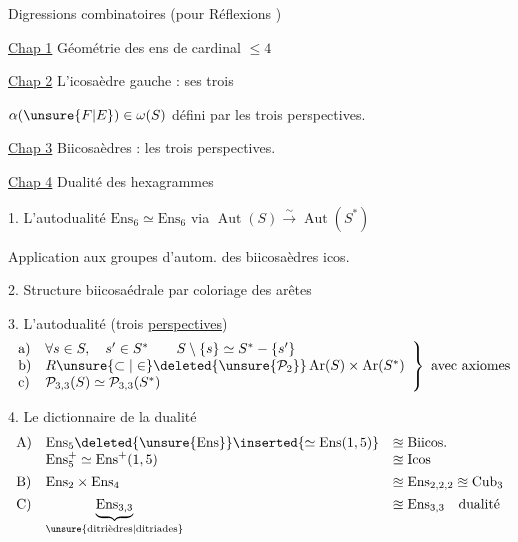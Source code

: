 
Digressions combinatoires (pour Réflexions )

\uline{Chap 1} Géométrie des ens de cardinal $\leq4$


\uline{Chap 2} L'icosaèdre gauche : ses trois

$\alpha(\unsure{F|E})\in\omega(S)$ défini par les trois perspectives.

\uline{Chap 3} Biicosaèdres : les trois perspectives.

\uline{Chap 4} Dualité des hexagrammes


1. L'autodualité $\mathrm{Ens}_6\simeq\mathrm{Ens}_6$
 via
$\operatorname{Aut}(S)\xrightarrow{\sim}\operatorname{Aut}(S^*)$

Application aux groupes d'autom. des
biicosaèdres  icos.

2. Structure biicosaédrale par coloriage des arêtes

3. L'autodualité (trois \uline{perspectives})
\[
\left.\begin{array}{ll}
\text{a)}&\forall s\in S,\quad s'\in S^*\qquad
 S\setminus\{s\}\simeq S^*-\{s'\}\\
\text{b)}&R\unsure{\subset|\in}\deleted{\unsure{\mathcal P_2}}
 \operatorname{Ar}(S)\times\operatorname{Ar}(S^*)\\
\text{c)}&\mathcal P_{3,3}(S)\simeq\mathcal P_{3,3}(S^*)
\end{array}\right\}\ \text{avec axiomes}
\]

4. Le dictionnaire de la dualité
\[
\begin{array}{lll}
\text{A)}&\mathrm{Ens}_5\deleted{\unsure{\mathrm{Ens}}}
 \inserted{\simeq\mathrm{Ens}(1,5)}&\approxeq\mathrm{Biicos.}\\
&\mathrm{Ens}_5^+\simeq\mathrm{Ens}^+(1,5)&\approxeq\mathrm{Icos}\\[1ex]
\text{B)}&\mathrm{Ens}_2\times\mathrm{Ens}_4
 &\approxeq\mathrm{Ens}_{2,2,2}\approxeq\mathrm{Cub}_3\\[1ex]
\text{C)}&\underbrace{\mathrm{Ens}_{3,3}}_{\text{\unsure{ditrièdres|ditriades}}}
 &\approxeq\mathrm{Ens}_{3,3}\quad\text{dualité}
\end{array}
\]

